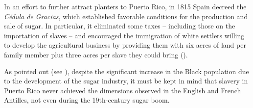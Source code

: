 \documentclass[output=paper,colorlinks,citecolor=brown]{langscibook}
\begin{document}
In an effort to further attract planters to Puerto Rico, in 1815 Spain decreed the \textit{Cédula de Gracias}, which established favorable conditions for the production and sale of sugar. In particular, it eliminated some taxes -- including those on the importation of slaves -- and encouraged the immigration of white settlers willing to develop the agricultural business by providing them with six acres of land per family member plus three acres per slave they could bring (\citealt{Baralt1981,Dorsey2003}).

As \citet[77]{AlvarezNazario1974} pointed out (see ), despite the significant increase in the Black population due to the development of the sugar industry, it must be kept in mind that slavery in Puerto Rico never achieved the dimensions observed in the English and French Antilles, not even during the 19th-century sugar boom.

\begin{table}
\caption{Population of Puerto Rico in the first third of the 19th century\label{tab:visconti:8}}
\end{table}
\end{document}
